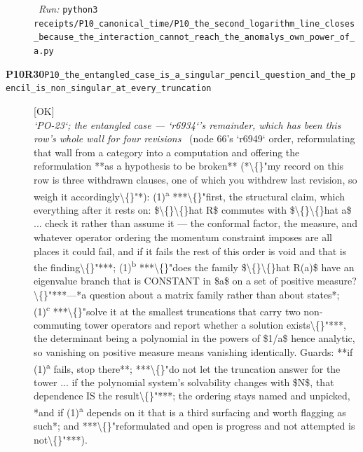 \begin{description}
\ \emph{Run:} \texttt{python3 receipts/P10\_canonical\_time/P10\_the\_second\_logarithm\_line\_closes\_because\_the\_interaction\_cannot\_reach\_the\_anomalys\_own\_power\_of\_a.py}
\item[\rcptlabel{P10_the_entangled_case_is_a_singular_pencil_question_and_the_pencil_is_non_singular_at_every_truncation}{P10R30}\textbf{P10R30}\quad\texttt{P10\_the\_entangled\_case\_is\_a\_singular\_pencil\_question\_and\_the\_pencil\_is\_non\_singular\_at\_every\_truncation}]\hfill\textsf{[OK]}\\
\textit{`PO-23`; the entangled case --- `r6934`'s remainder, which has been this row's whole wall for four revisions} \ (node 66's `r6949` order, reformulating that wall from a category into a computation and offering the reformulation **as a hypothesis to be broken** (*\textbackslash\{\}"my record on this row is three withdrawn clauses, one of which you withdrew last revision, so weigh it accordingly\textbackslash\{\}"*): (1)\textsuperscript{a} ***\textbackslash\{\}"first, the structural claim, which everything after it rests on: \$\textbackslash\{\}\textbackslash\{\}hat R\$ commutes with \$\textbackslash\{\}\textbackslash\{\}hat a\$ ... check it rather than assume it --- the conformal factor, the measure, and whatever operator ordering the momentum constraint imposes are all places it could fail, and if it fails the rest of this order is void and that is the finding\textbackslash\{\}"***; (1)\textsuperscript{b} ***\textbackslash\{\}"does the family \$\textbackslash\{\}\textbackslash\{\}hat R(a)\$ have an eigenvalue branch that is CONSTANT in \$a\$ on a set of positive measure?\textbackslash\{\}"***---*a question about a matrix family rather than about states*; (1)\textsuperscript{c} ***\textbackslash\{\}"solve it at the smallest truncations that carry two non-commuting tower operators and report whether a solution exists\textbackslash\{\}"***, the determinant being a polynomial in the powers of \$1/a\$ hence analytic, so vanishing on positive measure means vanishing identically.  Guards: **if (1)\textsuperscript{a} fails, stop there**; ***\textbackslash\{\}"do not let the truncation answer for the tower ... if the polynomial system's solvability changes with \$N\$, that dependence IS the result\textbackslash\{\}"***; the ordering stays named and unpicked, *and if (1)\textsuperscript{a} depends on it that is a third surfacing and worth flagging as such*; and ***\textbackslash\{\}"reformulated and open is progress and not attempted is not\textbackslash\{\}"***). 

\end{description}
